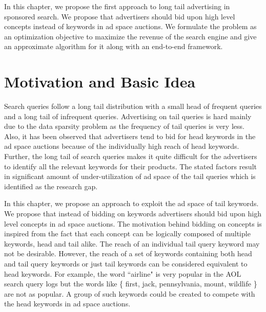 In this chapter, we propose the first approach to long tail advertising in sponsored search. We propose that advertisers should bid upon high level concepts instead of keywords in ad space auctions. We formulate the problem as an optimization objective to maximize the revenue of the search engine and give an approximate algorithm for it along with an end-to-end framework. 




\section{Motivation and Basic Idea}
Search queries follow a long tail distribution with a small head of frequent queries and a long tail of infrequent queries. Advertising on tail queries is hard mainly due to the data sparsity problem as the frequency of tail queries is very less. Also, it has been observed that advertisers tend to bid for head keywords in the ad space auctions because of the individually high reach of head keywords. Further, the long tail of search queries makes it quite difficult for the advertisers to identify all the relevant keywords for their products. The stated factors result in significant amount of under-utilization of ad space of the tail queries which is identified as the research gap.

In this chapter, we propose an approach to exploit the ad space of tail keywords. We propose that instead of bidding on keywords advertisers should bid upon high level concepts in ad space auctions. The motivation behind bidding on concepts is inspired from the fact that each concept can be logically composed of multiple keywords, head and tail alike. The reach of an individual tail query keyword may not be desirable. However, the reach of a set of keywords containing both head and tail query keywords or just tail keywords can be considered equivalent to head keywords. For example, the word ``airline" is very popular in the AOL search query logs but the words like \{ first, jack, pennsylvania, mount, wildlife \} are not as popular. A group of such keywords could be created to compete with the head keywords in ad space auctions. 

